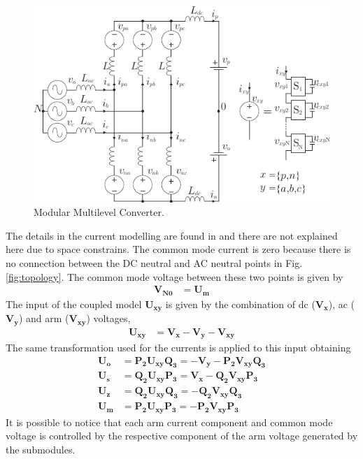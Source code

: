 \documentclass[conference]{IEEEtran}
\begin{document}
\begin{figure}[!t]
\centering
\includegraphics[]{images/MMC.pdf}
\caption{Modular Multilevel Converter.}
\label{fig:MMC}
\end{figure}

The details in the current modelling are found in \cite{7047221} and there are not explained here due to space constrains. The common mode current is zero because there is no connection between the DC neutral and AC neutral points in Fig. \ref{fig:topology}. 
The common mode voltage between these two points is given by
\begin{align}
\mathbf{V_{N0}}&=\mathbf{U_{m}}
\end{align}
The input of the coupled model $\mathbf{U_{xy}}$ is given by the combination of dc ($\mathbf{V_{x}}$), ac ($\mathbf{V_{y}}$) and arm ($\mathbf{V_{xy}}$) voltages,
\begin{align}
\mathbf{U_{xy}}&=\mathbf{V_{x}}-\mathbf{V_{y}}-\mathbf{V_{xy}}
\end{align}
The same transformation used for the currents is applied to this input obtaining 
\begin{align}
\mathbf{U_{o}}&=\mathbf{P_2}\mathbf{U_{xy}}\mathbf{Q_3}=-\mathbf{V_{y}}-\mathbf{P_2}\mathbf{V_{xy}}\mathbf{Q_3}\\
\mathbf{U_{s}}&=\mathbf{Q_2}\mathbf{U_{xy}}\mathbf{P_3}=\mathbf{V_{x}}-\mathbf{Q_2}\mathbf{V_{xy}}\mathbf{P_3}\\
\mathbf{U_{z}}&=\mathbf{Q_2}\mathbf{U_{xy}}\mathbf{Q_3}=-\mathbf{Q_2}\mathbf{V_{xy}}\mathbf{Q_3}\\
\mathbf{U_{m}}&=\mathbf{P_2}\mathbf{U_{xy}}\mathbf{P_3}=-\mathbf{P_2}\mathbf{V_{xy}}\mathbf{P_3}
\end{align}
It is possible to notice that each arm current component and common mode voltage is controlled by the respective component of the arm voltage generated by the submodules.
\end{document}
